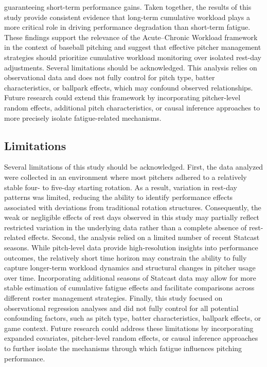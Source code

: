 \documentclass[12pt, letterpaper]{article}
\begin{document}
guaranteeing short-term performance gains. Taken together, the results of this study provide consistent evidence that long-term cumulative workload plays a more critical role in driving performance degradation than short-term fatigue. These findings support the relevance of the Acute--Chronic Workload framework in the context of baseball pitching and suggest that effective pitcher management strategies should prioritize cumulative workload monitoring over isolated rest-day adjustments. Several limitations should be acknowledged. This analysis relies on observational data and does not fully control for pitch type, batter characteristics, or ballpark effects, which may confound observed relationships. Future research could extend this framework by incorporating pitcher-level random effects, additional pitch characteristics, or causal inference approaches to more precisely isolate fatigue-related mechanisms.

\subsection{Limitations}
  Several limitations of this study should be acknowledged. First, the data analyzed were collected in an environment where most pitchers adhered to a relatively stable four- to five-day starting rotation. As a result, variation in rest-day patterns was limited, reducing the ability to identify performance effects associated with deviations from traditional rotation structures. Consequently, the weak or negligible effects of rest days observed in this study may partially reflect restricted variation in the underlying data rather than a complete absence of rest-related effects. Second, the analysis relied on a limited number of recent Statcast seasons. While pitch-level data provide high-resolution insights into performance outcomes, the relatively short time horizon may constrain the ability to fully capture longer-term workload dynamics and structural changes in pitcher usage over time. Incorporating additional seasons of Statcast data may allow for more stable estimation of cumulative fatigue effects and facilitate comparisons across different roster management strategies. Finally, this study focused on observational regression analyses and did not fully control for all potential confounding factors, such as pitch type, batter characteristics, ballpark effects, or game context. Future research could address these limitations by incorporating expanded covariates, pitcher-level random effects, or causal inference approaches to further isolate the mechanisms through which fatigue influences pitching performance.
\end{document}
